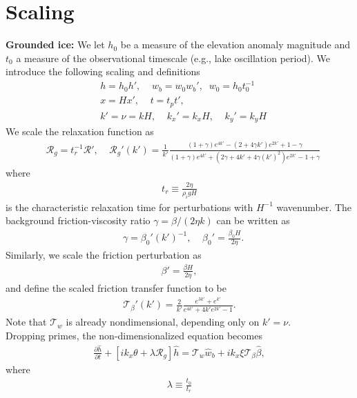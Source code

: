 \documentclass[paper=a4, fontsize=11pt]{article}
\begin{document}
\section*{Scaling}
\textbf{Grounded ice:}
We let $h_0$ be a measure of the elevation anomaly magnitude and
$t_0$ a measure of the observational timescale (e.g., lake oscillation period).
We introduce the following scaling and definitions
\begin{align}
& h = h_0 h', \;\;\;\; w_b = w_0 w_{b}' , \;\; w_0 = h_0 t_0^{-1} \\
&  x = Hx', \;\;\;\;
t = t_p t', \;\;\;\;\\
& k' = \nu = kH , \;\;\;\; k_x' = k_x H,\;\;\;\; k_y' = k_y H
\end{align}
We scale the relaxation function as
\begin{align}
   &\mathcal{R}_g = t_r^{-1} \mathcal{R}', \;\;\;\;
 \mathcal{R}_g'(k') =  \frac{1}{k'}\frac{ (1+\gamma)e^{4k'} -(2+4\gamma k')e^{2 k'} +1-\gamma  }{ (1+\gamma)e^{4 k'} + (2\gamma+4 k'+4\gamma (k')^2)e^{2 k'} -1 + \gamma  }
\end{align}
where
\begin{align}
t_r \equiv \frac{2\eta}{\rho_i g H}
\end{align}
is the characteristic relaxation time for perturbations with $H^{-1}$ wavenumber.
The background friction-viscosity ratio $\gamma=\beta/(2\eta k)$ can be written as
\begin{align}
   &\gamma = \beta_0' (k')^{-1}, \;\;\;\; \beta_0' = \frac{\beta_0 H}{2\eta}.
\end{align}
Similarly, we scale the friction perturbation as
\begin{align}
\beta' = \frac{ \beta H}{2\eta},
\end{align}
and define the scaled friction transfer function to be
\begin{align}
\mathcal{T}_{\beta}'(k') =  \frac{2}{k'}\frac{e^{3k'} + e^{k'}}{e^{4 k'} +4 k' e^{2 k'} -1 }.
\end{align}
Note that $\mathcal{T}_w$ is already nondimensional, depending only on $k' = \nu$.
\\
Dropping primes, the non-dimensionalized equation becomes
\begin{align}
\frac{\partial \widehat{h}}{\partial t} +\left[ik_x \theta + \lambda\mathcal{R}_g \right]\widehat{h} = \mathcal{T}_w\widehat{w}_b +   {ik_x\xi}\mathcal{T}_{\beta}\widehat{\beta}, \label{dhhatsc}
\end{align}
where
\begin{align}
  \lambda \equiv  \frac{t_0}{t_r}
\end{align}
\end{document}
